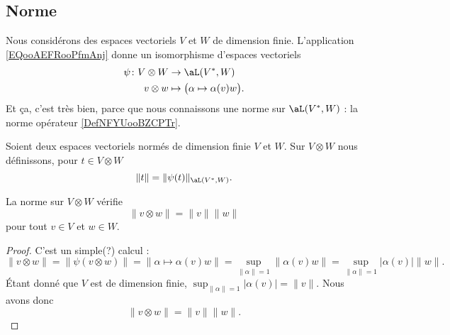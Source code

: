 \subsection{Norme}

Nous considérons des espaces vectoriels \( V\) et \( W\) de dimension finie. L'application \eqref{EQooAEFRooPfmAnj} donne un isomorphisme d'espaces vectoriels
\begin{equation}
	\begin{aligned}
		\psi\colon V\otimes W & \to \aL(V^*,W)                                \\
		v\otimes w            & \mapsto \big( \alpha\mapsto \alpha(v)w \big).
	\end{aligned}
\end{equation}
Et ça, c'est très bien, parce que nous connaissons une norme sur \( \aL(V^*,W)\) :  la norme opérateur \ref{DefNFYUooBZCPTr}.

\begin{definition}      \label{DEFooEXXNooMgIpSV}
	Soient deux espaces vectoriels normés de dimension finie \( V\) et \( W\). Sur \( V\otimes W\) nous définissons, pour \( t\in V\otimes W\)
	\begin{equation}
		\| t \|=\| \psi(t) \|_{\aL(V^*,W)}.
	\end{equation}
\end{definition}

\begin{lemma}        \label{LEMooQPXHooJWfpmk}
	La norme sur \( V\otimes W\) vérifie
	\begin{equation}
		\| v\otimes w \|=\| v \|\| w \|
	\end{equation}
	pour tout \( v\in V\) et \( w\in W\).
\end{lemma}

\begin{proof}
	C'est un simple(?) calcul :
	\begin{equation}
		\| v\otimes w \|=\| \psi(v\otimes w) \|=\| \alpha\mapsto \alpha(v)w \|=\sup_{\| \alpha \|=1}\| \alpha(v)w \|=\sup_{\| \alpha \|=1}| \alpha(v) |\| w \|.
	\end{equation}
	Étant donné que \( V\) est de dimension finie, \( \sup_{\| \alpha \|=1}| \alpha(v) |=\| v \|\). Nous avons donc
	\begin{equation}
		\| v\otimes w \|=\| v \|\| w \|.
	\end{equation}
\end{proof}

